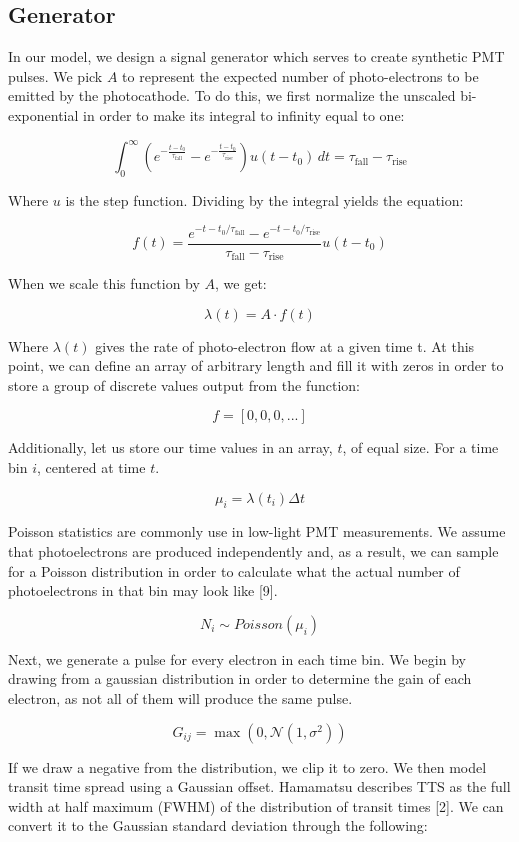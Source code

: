 \documentclass[10pt]{article}
\begin{document}
\subsection{Generator}
In our model, we design a signal generator which serves to create synthetic PMT pulses. We pick $A$ to represent the expected number of photo-electrons to be emitted by the photocathode. To do this, we first normalize the unscaled bi-exponential in order to make its integral to infinity equal to one: 

$$
\int_{0}^{\infty} (e^{-\frac{t - t_0}{\tau_{\text{fall}}}} - e^{-\frac{t - t_0}{\tau_{\text{rise}}}} ) u(t- t_0)\,dt = \tau_{\text{fall}} - \tau_{\text{rise}}  
$$

Where $u$ is the step function. Dividing by the integral yields the equation: 

$$
f(t) = \frac{e^{-{t - t_0}/{\tau_{\text{fall}}}} - e^{-{t - t_0}/{\tau_{\text{rise}}}}}{\tau_{\text{fall}} - \tau_{\text{rise}}} u(t-t_0)
$$

When we scale this function by $A$, we get:

$$
\lambda(t) = A\cdot f(t)
$$ 

Where $\lambda(t)$ gives the rate of photo-electron flow at a given time t. At this point, we can define an array of arbitrary length and fill it with zeros in order to store a group of discrete values output from the function:

$$
f = [0,0,0,...]
$$

Additionally, let us store our time values in an array, $t$, of equal size. For a time bin $i$, centered at time $t$.

$$
\mu_i = \lambda(t_i)\Delta t
$$

Poisson statistics are commonly use in low-light PMT measurements. We assume that photoelectrons are produced independently and, as a result, we can sample for a Poisson distribution in order to calculate what the actual number of photoelectrons in that bin may look like [9].   

$$
N_{i} \sim Poisson( \mu_i )
$$

Next, we generate a pulse for every electron in each time bin. We begin by drawing from a gaussian distribution in order to determine the gain of each electron, as not all of them will produce the same pulse. 

$$
G_{ij} = \max(0,\mathcal{N}(1, \sigma^2))
$$

If we draw a negative from the distribution, we clip it to zero. We then model transit time spread using a Gaussian offset. Hamamatsu describes TTS as the full width at half maximum (FWHM) of the distribution of transit times [2]. We can convert it to the Gaussian standard deviation through the following: 
\end{document}
